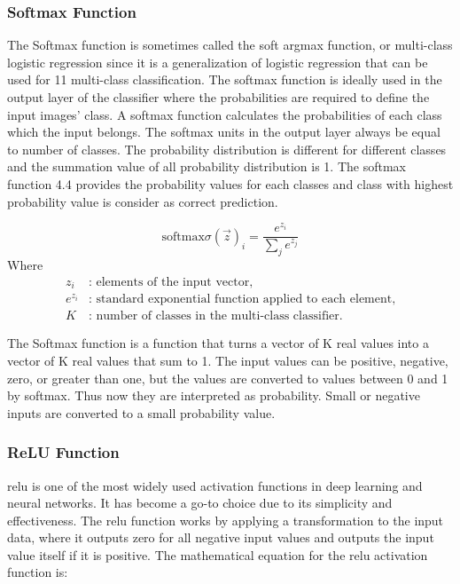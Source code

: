 \subsubsection{Softmax Function}
The Softmax function is sometimes called the soft argmax function, or multi-class
logistic regression since it is a generalization of logistic regression that can be used for
11 multi-class classification. The softmax function is ideally used in the output layer of the classifier where the probabilities are required to define the input images’ class. A
softmax function calculates the probabilities of each class which the input belongs. The
softmax units in the output layer always be equal to number of classes. The probability
distribution is different for different classes and the summation value of all probability
distribution is 1. The softmax function 4.4 provides the probability values for each
classes and class with highest probability value is consider as correct prediction.


\begin{equation}
\text{softmax}\sigma(\vec{z})_i = \frac{e^{z_i}}{\sum_{j} e^{z_j}}
\end{equation}
Where
\begin{align*}
    z_i &: \text{ elements of the input vector,} \\
    e^{z_i} &: \text{ standard exponential function applied to each element,} \\
    K &: \text{ number of classes in the multi-class classifier.}
\end{align*}\quad



The Softmax function is a function that turns a vector of K real values into a vector of
K real values that sum to 1. The input values can be positive, negative, zero, or greater
than one, but the values are converted to values between 0 and 1 by softmax. Thus now
they are interpreted as probability. Small or negative inputs are converted to a small
probability value.

\subsubsection{ReLU Function}
\gls{relu} is one of the most widely used activation functions in deep learning and neural networks. It has become a go-to choice due to its simplicity and effectiveness. The \gls{relu} function works by applying a transformation to the input data, where it outputs zero for all negative input values and outputs the input value itself if it is positive. The mathematical equation for the \gls{relu} activation function is:



